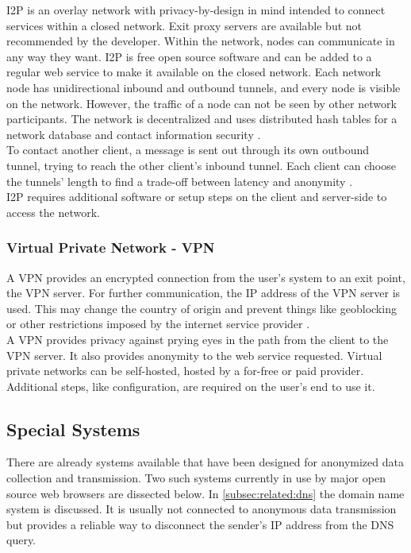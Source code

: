         I2P is an overlay network with privacy-by-design in mind intended to connect services within a closed network.
        Exit proxy servers are available but not recommended by the developer. Within the network, nodes can communicate in any way they want. I2P is free open source software and can be added to a regular web service to make it available on the closed network. Each network node has unidirectional inbound and outbound tunnels, and every node is visible on the network. However, the traffic of a node can not be seen by other network participants. The network is decentralized and uses distributed hash tables for a network database and contact information security \cite{i2p_intro_2014}.\\
        To contact another client, a message is sent out through its own outbound tunnel, trying to reach the other client's inbound tunnel. Each client can choose the tunnels' length to find a trade-off between latency and anonymity \cite{anoncoin_i2p_2018}.\\
        I2P requires additional software or setup steps on the client and server-side to access the network.\\
        
        
        
    
    \subsubsection{Virtual Private Network - VPN}
    
        A VPN provides an encrypted connection from the user's system to an exit point, the VPN server. For further communication, the IP address of the VPN server is used. This may change the country of origin and prevent things like geoblocking or other restrictions imposed by the internet service provider \cite{microsoft_virtual_2009}.\\
        A VPN provides privacy against prying eyes in the path from the client to the VPN server. It also provides anonymity to the web service requested. Virtual private networks can be self-hosted, hosted by a for-free or paid provider. Additional steps, like configuration, are required on the user's end to use it.\\

    
    \subsection{Special Systems}
        \label{subsec:related:special}
        There are already systems available that have been designed for anonymized data collection and transmission. 
        Two such systems currently in use by major open source web browsers are dissected below. In \ref{subsec:related:dns} the domain name system is discussed. It is usually not connected to anonymous data transmission but provides a reliable way to disconnect the sender's IP address from the DNS query.
        
